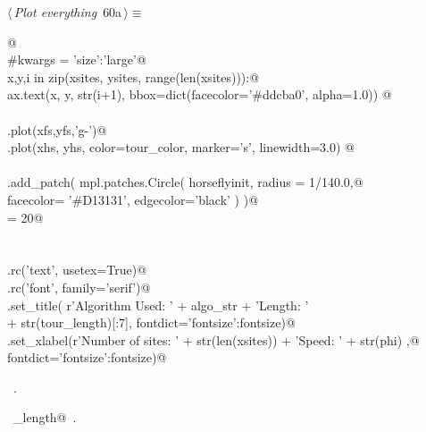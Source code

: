 \documentclass[11.5pt]{report}
\begin{document}
\vspace{-0.8cm} \newchunk
\begin{flushleft} \small
\begin{minipage}{\linewidth}\label{scrap91}\raggedright\small
{} $\langle\,${\itshape Plot everything}\nobreak\ {\footnotesize {60a}}$\,\rangle\equiv$
\vspace{-1ex}
\begin{list}{}{} \item
\mbox{}\verb@ @\\
\mbox{}\verb@#kwargs = {'size':'large'}@\\
\mbox{}\verb@for x,y,i in zip(xsites, ysites, range(len(xsites))):@\\
\mbox{}\verb@    ax.text(x, y, str(i+1), bbox=dict(facecolor='#ddcba0', alpha=1.0)) @\\
\mbox{}\verb@@\\
\mbox{}\verb@ax.plot(xfs,yfs,'g-')@\\
\mbox{}\verb@ax.plot(xhs, yhs, color=tour_color, marker='s', linewidth=3.0) @\\
\mbox{}\verb@@\\
\mbox{}\verb@ax.add_patch( mpl.patches.Circle( horseflyinit, radius = 1/140.0,@\\
\mbox{}\verb@                                  facecolor= '#D13131', edgecolor='black'   )  )@\\
\mbox{}\verb@fontsize = 20@\\
\mbox{}\verb@@\\
\mbox{}\verb@@\\
\mbox{}\verb@plt.rc('text', usetex=True)@\\
\mbox{}\verb@plt.rc('font', family='serif')@\\
\mbox{}\verb@ax.set_title( r'Algorithm Used: ' + algo_str +  '\nTour Length: ' \@\\
\mbox{}\verb@               + str(tour_length)[:7], fontdict={'fontsize':fontsize})@\\
\mbox{}\verb@ax.set_xlabel(r'Number of sites: ' + str(len(xsites)) + '\nDrone Speed: ' + str(phi) ,@\\
\mbox{}\verb@                  fontdict={'fontsize':fontsize})@\\
\mbox{}\verb@@{\NWsep}
\end{list}
\vspace{-1.5ex}
\footnotesize
\begin{list}{}{\setlength{\itemsep}{-\parsep}\setlength{\itemindent}{-\leftmargin}}
\item \NWtxtMacroRefIn\ .
\item \NWtxtIdentsUsed\nobreak\  \verb@tour_length@\nobreak\ .
\item{}
\end{list}
\end{minipage}\vspace{4ex}
\end{flushleft}
\end{document}
